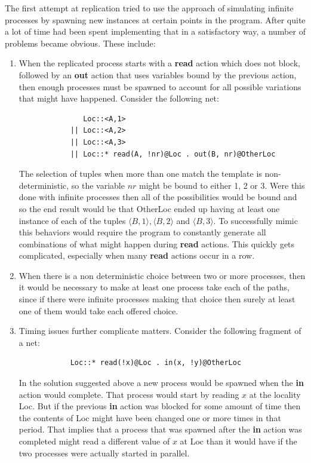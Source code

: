 	The first attempt at replication tried to use the approach of simulating 
	infinite processes by spawning new instances at certain points in the 
	program. After quite a lot of time had been spent implementing that in a 
	satisfactory way, a number of problems became obvious. These include:
		
	\begin{enumerate}
		\item When the replicated process starts with a \textbf{read} action
		which does not block, followed by an \textbf{out} action that uses 
		variables bound by the previous action, then enough processes must be 
		spawned to account for all possible variations that might have happened.
		Consider the following net:
			
		\begin{verbatim}
			   Loc::<A,1>
			|| Loc::<A,2>
			|| Loc::<A,3>			
			|| Loc::* read(A, !nr)@Loc . out(B, nr)@OtherLoc
		\end{verbatim}
	
	The selection of tuples when more than one match the template is 
	non-deterministic, so the variable $nr$ might be bound to either 1, 2 or 3. 
	Were this done with infinite processes then all of the possibilities would 
	be bound and so the end result would be that \textsf{OtherLoc} ended up 
	having at least one instance of each of the tuples $\langle B, 1 \rangle, 
	\langle B, 2 \rangle$ and $\langle B, 3 \rangle$. To successfully mimic this 
	behaviors would require the program to constantly generate all combinations 
	of what might happen during \textbf{read} actions. This quickly gets 
	complicated, especially when many \textbf{read} actions occur in a row.
	
	\item When there is a non deterministic choice between two or more 
	processes, then it would be necessary to make at least one process take each 
	of the paths, since if there were infinite processes making that choice then 
	surely at least one of them would take each offered choice.
	
	\item Timing issues further complicate matters. Consider the following 
	fragment of a net:
	
		\begin{verbatim}
			Loc::* read(!x)@Loc . in(x, !y)@OtherLoc
		\end{verbatim}
	
	In the solution suggested above a new process would be spawned when the 
	\textbf{in} action would complete. That process would start by reading $x$ 
	at the locality \textsf{Loc}. But if the previous \textbf{in} action was 
	blocked for some amount of time then the contents of \textsf{Loc} might have 
	been changed one or more times in that period. That implies that a process 
	that was spawned after the \textbf{in} action was completed might read a 
	different value of $x$ at \textsf{Loc} than it would have if the two 
	processes were actually started in parallel.
	
	\end{enumerate}
	
